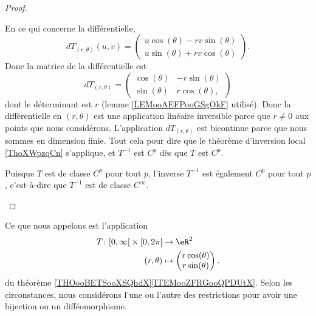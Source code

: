 \begin{proof}
\begin{enumerate}
		      En ce qui concerne la différentielle,
		      \begin{equation}
			      dT_{(r,\theta)}(u,v)=\begin{pmatrix}
				      u\cos(\theta)-rv\sin(\theta) \\
				      u\sin(\theta)+rv\cos(\theta)
			      \end{pmatrix}.
		      \end{equation}
		      Donc la matrice de la différentielle est
		      \begin{equation}
			      dT_{(r,\theta)}=\begin{pmatrix}
				      \cos(\theta) & -r\sin(\theta) \\
				      \sin(\theta) & r\cos(\theta),
			      \end{pmatrix}
		      \end{equation}
		      dont le déterminant est \( r\) (lemme \ref{LEMooAEFPooGSgOkF} utilisé). Donc la différentielle en \( (r,\theta)\) est une application linéaire inversible parce que \( r\neq 0\) aux points que nous considérons. L'application \( dT_{(r,\theta)}\) est bicontinue parce que nous sommes en dimension finie. Tout cela pour dire que le théorème d'inversion local \ref{ThoXWpzqCn} s'applique, et \( T^{-1}\) est \( C^p\) dès que \( T\) est \( C^p\).

		      Puisque \( T\) est de classe \( C^p\) pour tout \( p\), l'inverse \( T^{-1}\) est également \( C^p\) pour tout \( p\), c'est-à-dire que \( T^{-1}\) est de classe \(  C^{\infty}\).
	\end{enumerate}
\end{proof}

\begin{definition}
	Ce que nous appelons  est l'application
	\begin{equation}
		\begin{aligned}
			T\colon \mathopen[ 0 , \infty \mathclose[\times \mathopen[ 0 , 2\pi \mathclose[ & \to \eR^2              \\
			(r,\theta)                                                                      & \mapsto \begin{pmatrix}
				                                                                                          r\cos(\theta) \\
				                                                                                          r\sin(\theta)
			                                                                                          \end{pmatrix}.
		\end{aligned}
	\end{equation}
	du théorème \ref{THOooBETSooXSQhdX}\ref{ITEMooZFRGooQPDUtX}. Selon les circonstances, nous considérons l'une ou l'autre des restrictions pour avoir une bijection ou un difféomorphisme.
\end{definition}

